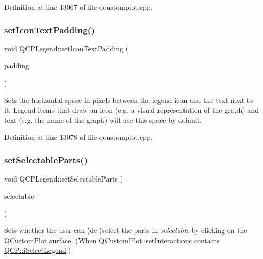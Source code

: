 Definition at line 13067 of file qcustomplot.\+cpp.

\mbox{\label{class_q_c_p_legend_a62973bd69d5155e8ea3141366e8968f6}} 
\subsubsection{\texorpdfstring{set\+Icon\+Text\+Padding()}{setIconTextPadding()}}
{\footnotesize\ttfamily void Q\+C\+P\+Legend\+::set\+Icon\+Text\+Padding (\begin{DoxyParamCaption}\item[{int}]{padding }\end{DoxyParamCaption})}

Sets the horizontal space in pixels between the legend icon and the text next to it. Legend items that draw an icon (e.\+g. a visual representation of the graph) and text (e.\+g. the name of the graph) will use this space by default. 

Definition at line 13078 of file qcustomplot.\+cpp.

\mbox{\label{class_q_c_p_legend_a9ce60aa8bbd89f62ae4fa83ac6c60110}} 
\subsubsection{\texorpdfstring{set\+Selectable\+Parts()}{setSelectableParts()}}
{\footnotesize\ttfamily void Q\+C\+P\+Legend\+::set\+Selectable\+Parts (\begin{DoxyParamCaption}\item[{const Selectable\+Parts \&}]{selectable }\end{DoxyParamCaption})}

Sets whether the user can (de-\/)select the parts in {\itshape selectable} by clicking on the \hyperlink{class_q_custom_plot}{Q\+Custom\+Plot} surface. (When \hyperlink{class_q_custom_plot_a5ee1e2f6ae27419deca53e75907c27e5}{Q\+Custom\+Plot\+::set\+Interactions} contains \hyperlink{namespace_q_c_p_a2ad6bb6281c7c2d593d4277b44c2b037a269c9af298e257d1108edec0432b5513}{Q\+C\+P\+::i\+Select\+Legend}.)

